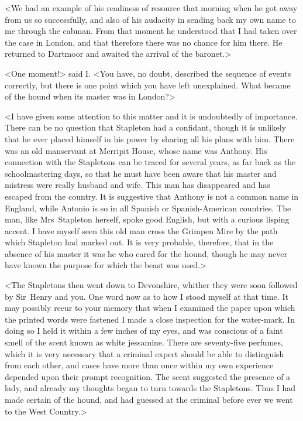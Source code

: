 <We had an example of his readiness of resource that morning when he got away from us so successfully, and also of his audacity in sending back my own name to me through the cabman. From that moment he understood that I had taken over the case in London, and that therefore there was no chance for him there. He returned to Dartmoor and awaited the arrival of the baronet.>

<One moment!> said I\@. <You have, no doubt, described the sequence of events correctly, but there is one point which you have left unexplained. What became of the hound when its master was in London?>

<I have given some attention to this matter and it is undoubtedly of importance. There can be no question that Stapleton had a confidant, though it is unlikely that he ever placed himself in his power by sharing all his plans with him. There was an old manservant at Merripit House, whose name was Anthony. His connection with the Stapletons can be traced for several years, as far back as the schoolmastering days, so that he must have been aware that his master and mistress were really husband and wife. This man has disappeared and has escaped from the country. It is suggestive that Anthony is not a common name in England, while Antonio is so in all Spanish or Spanish-American countries. The man, like Mrs~Stapleton herself, spoke good English, but with a curious lisping accent. I have myself seen this old man cross the Grimpen Mire by the path which Stapleton had marked out. It is very probable, therefore, that in the absence of his master it was he who cared for the hound, though he may never have known the purpose for which the beast was used.>

<The Stapletons then went down to Devonshire, whither they were soon followed by Sir~Henry and you. One word now as to how I stood myself at that time. It may possibly recur to your memory that when I examined the paper upon which the printed words were fastened I made a close inspection for the water-mark. In doing so I held it within a few inches of my eyes, and was conscious of a faint smell of the scent known as white jessamine. There are seventy-five perfumes, which it is very necessary that a criminal expert should be able to distinguish from each other, and cases have more than once within my own experience depended upon their prompt recognition. The scent suggested the presence of a lady, and already my thoughts began to turn towards the Stapletons. Thus I had made certain of the hound, and had guessed at the criminal before ever we went to the West Country.>

